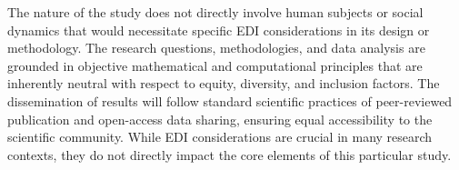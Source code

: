 \begin{edi-in-research}
\vspace{-1.0em}
The nature of the study does not directly involve human subjects or social dynamics that would necessitate specific EDI considerations in its design or methodology. The research questions, methodologies, and data analysis are grounded in objective mathematical and computational principles that are inherently neutral with respect to equity, diversity, and inclusion factors. The dissemination of results will follow standard scientific practices of peer-reviewed publication and open-access data sharing, ensuring equal accessibility to the scientific community. While EDI considerations are crucial in many research contexts, they do not directly impact the core elements of this particular study.
\end{edi-in-research}